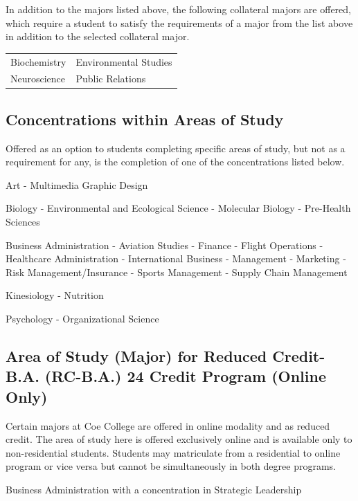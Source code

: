 \documentclass[
  letterpaper,
]{scrbook}
\renewcommand\toprule[2]\relax
\renewcommand\bottomrule[2]\relax
\newcounter{none}
\begin{document}
In addition to the majors listed above, the following collateral majors
are offered, which require a student to satisfy the requirements of a
major from the list above in addition to the selected collateral major.

{\def\LTcaptype{none} %
\begin{longtable}[]{@{}ll@{}}
\toprule\noalign{}
\endhead
\bottomrule\noalign{}
\endlastfoot
Biochemistry & Environmental Studies \\
Neuroscience & Public Relations \\
\end{longtable}
}

\subsection{Concentrations within Areas of
Study}\label{concentrations-within-areas-of-study}

Offered as an option to students completing specific areas of study, but
not as a requirement for any, is the completion of one of the
concentrations listed below.

Art - Multimedia Graphic Design

Biology - Environmental and Ecological Science - Molecular Biology -
Pre-Health Sciences

Business Administration - Aviation Studies - Finance - Flight Operations
- Healthcare Administration - International Business - Management -
Marketing - Risk Management/Insurance - Sports Management - Supply Chain
Management

Kinesiology - Nutrition

Psychology - Organizational Science

\subsection{Area of Study (Major) for Reduced Credit-B.A. (RC-B.A.) 24
Credit Program (Online
Only)}\label{area-of-study-major-for-reduced-credit-b.a.-rc-b.a.-24-credit-program-online-only}

Certain majors at Coe College are offered in online modality and as
reduced credit. The area of study here is offered exclusively online and
is available only to non-residential students. Students may matriculate
from a residential to online program or vice versa but cannot be
simultaneously in both degree programs.

Business Administration with a concentration in Strategic Leadership
\end{document}
